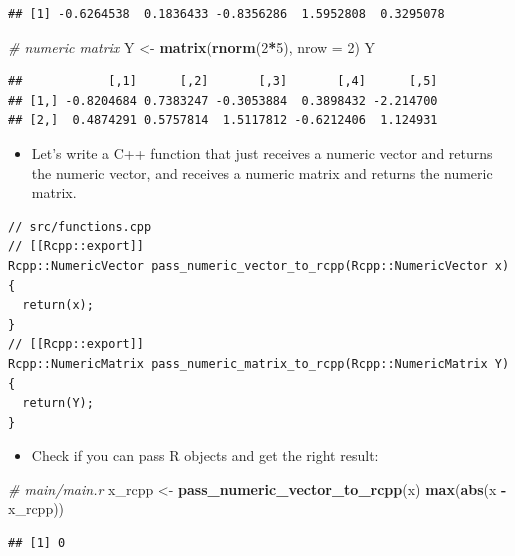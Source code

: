 \documentclass[]{book}
\newenvironment{Shaded}{\begin{snugshade}}{\end{snugshade}}
\newcommand{\KeywordTok}[1]{\textcolor[rgb]{0.13,0.29,0.53}{\textbf{#1}}}
\newcommand{\DataTypeTok}[1]{\textcolor[rgb]{0.13,0.29,0.53}{#1}}
\newcommand{\DecValTok}[1]{\textcolor[rgb]{0.00,0.00,0.81}{#1}}
\newcommand{\StringTok}[1]{\textcolor[rgb]{0.31,0.60,0.02}{#1}}
\newcommand{\CommentTok}[1]{\textcolor[rgb]{0.56,0.35,0.01}{\textit{#1}}}
\newcommand{\OperatorTok}[1]{\textcolor[rgb]{0.81,0.36,0.00}{\textbf{#1}}}
\newcommand{\NormalTok}[1]{#1}
\providecommand{\tightlist}{%
  \setlength{\itemsep}{0pt}\setlength{\parskip}{0pt}}
\begin{document}
\begin{verbatim}
## [1] -0.6264538  0.1836433 -0.8356286  1.5952808  0.3295078
\end{verbatim}

\begin{Shaded}
\begin{Highlighting}[]
\CommentTok{# numeric matrix}
\NormalTok{Y <-}\StringTok{ }\KeywordTok{matrix}\NormalTok{(}\KeywordTok{rnorm}\NormalTok{(}\DecValTok{2}\OperatorTok{*}\DecValTok{5}\NormalTok{), }\DataTypeTok{nrow =} \DecValTok{2}\NormalTok{)}
\NormalTok{Y}
\end{Highlighting}
\end{Shaded}

\begin{verbatim}
##            [,1]      [,2]       [,3]       [,4]      [,5]
## [1,] -0.8204684 0.7383247 -0.3053884  0.3898432 -2.214700
## [2,]  0.4874291 0.5757814  1.5117812 -0.6212406  1.124931
\end{verbatim}

\begin{itemize}
\tightlist
\item
  Let's write a C++ function that just receives a numeric vector and
  returns the numeric vector, and receives a numeric matrix and returns
  the numeric matrix.
\end{itemize}

\begin{verbatim}
// src/functions.cpp
// [[Rcpp::export]]
Rcpp::NumericVector pass_numeric_vector_to_rcpp(Rcpp::NumericVector x) {
  return(x);
}
// [[Rcpp::export]]
Rcpp::NumericMatrix pass_numeric_matrix_to_rcpp(Rcpp::NumericMatrix Y) {
  return(Y);
}
\end{verbatim}

\begin{itemize}
\tightlist
\item
  Check if you can pass R objects and get the right result:
\end{itemize}

\begin{Shaded}
\begin{Highlighting}[]
\CommentTok{# main/main.r}
\NormalTok{x_rcpp <-}\StringTok{ }\KeywordTok{pass_numeric_vector_to_rcpp}\NormalTok{(x)}
\KeywordTok{max}\NormalTok{(}\KeywordTok{abs}\NormalTok{(x }\OperatorTok{-}\StringTok{ }\NormalTok{x_rcpp))}
\end{Highlighting}
\end{Shaded}

\begin{verbatim}
## [1] 0
\end{verbatim}
\end{document}
